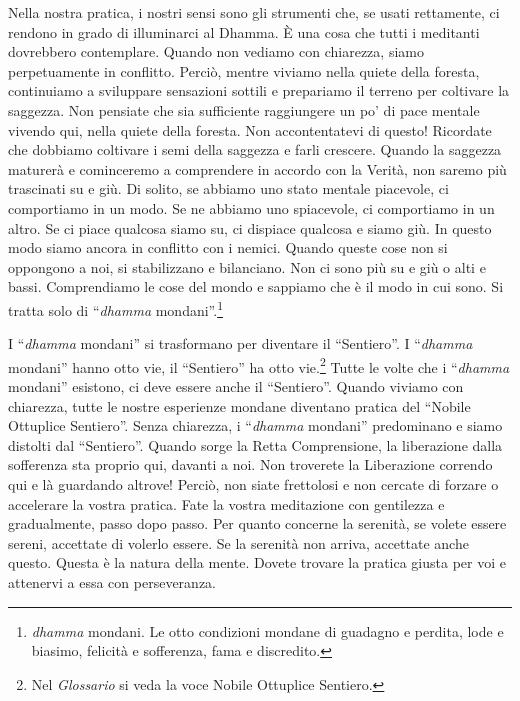 Nella nostra pratica, i nostri sensi sono gli strumenti che, se usati
rettamente, ci rendono in grado di illuminarci al Dhamma. È una cosa che
tutti i meditanti dovrebbero contemplare. Quando non vediamo con
chiarezza, siamo perpetuamente in conflitto. Perciò, mentre viviamo
nella quiete della foresta, continuiamo a sviluppare sensazioni sottili
e prepariamo il terreno per coltivare la saggezza. Non pensiate che sia
sufficiente raggiungere un po' di pace mentale vivendo qui, nella quiete
della foresta. Non accontentatevi di questo! Ricordate che dobbiamo
coltivare i semi della saggezza e farli crescere. Quando la saggezza
maturerà e cominceremo a comprendere in accordo con la Verità, non
saremo più trascinati su e giù. Di solito, se abbiamo uno stato mentale
piacevole, ci comportiamo in un modo. Se ne abbiamo uno spiacevole, ci
comportiamo in un altro. Se ci piace qualcosa siamo su, ci dispiace
qualcosa e siamo giù. In questo modo siamo ancora in conflitto con i
nemici. Quando queste cose non si oppongono a noi, si stabilizzano e
bilanciano. Non ci sono più su e giù o alti e bassi. Comprendiamo le
cose del mondo e sappiamo che è il modo in cui sono. Si tratta solo di
``\emph{dhamma} mondani''.\footnote{\emph{dhamma} mondani. Le otto
  condizioni mondane di guadagno e perdita, lode e biasimo, felicità e
  sofferenza, fama e discredito.}

I ``\emph{dhamma} mondani'' si trasformano per diventare il
``Sentiero''. I ``\emph{dhamma} mondani'' hanno otto vie, il
``Sentiero'' ha otto vie.\footnote{Nel \emph{Glossario} si veda la voce
  Nobile Ottuplice Sentiero.} Tutte le volte che i ``\emph{dhamma}
mondani'' esistono, ci deve essere anche il ``Sentiero''. Quando viviamo
con chiarezza, tutte le nostre esperienze mondane diventano pratica del
``Nobile Ottuplice Sentiero''. Senza chiarezza, i ``\emph{dhamma}
mondani'' predominano e siamo distolti dal ``Sentiero''. Quando sorge la
Retta Comprensione, la liberazione dalla sofferenza sta proprio qui,
davanti a noi. Non troverete la Liberazione correndo qui e là guardando
altrove! Perciò, non siate frettolosi e non cercate di forzare o
accelerare la vostra pratica. Fate la vostra meditazione con gentilezza
e gradualmente, passo dopo passo. Per quanto concerne la serenità, se
volete essere sereni, accettate di volerlo essere. Se la serenità non
arriva, accettate anche questo. Questa è la natura della mente. Dovete
trovare la pratica giusta per voi e attenervi a essa con perseveranza.

